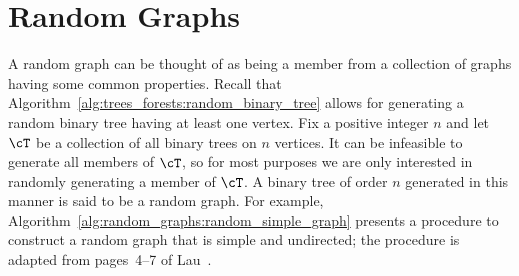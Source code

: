 
\chapter{Random Graphs}
\label{chap:random_graphs}

A random graph can be thought of as being a member
from a collection of graphs having some common properties. Recall that
Algorithm~\ref{alg:trees_forests:random_binary_tree} allows for
generating a random binary tree having at least one vertex. Fix a
positive integer $n$ and let $\cT$ be a collection of all binary trees
on $n$ vertices. It can be infeasible to generate all members of
$\cT$, so for most purposes we are only interested in randomly
generating a member of $\cT$. A binary tree of order $n$ generated in
this manner is said to be a random graph. For
example, Algorithm~\ref{alg:random_graphs:random_simple_graph}
presents a procedure to construct a random graph that is simple and
undirected; the procedure is adapted from pages~4--7 of
Lau~\cite{Lau2007}.




